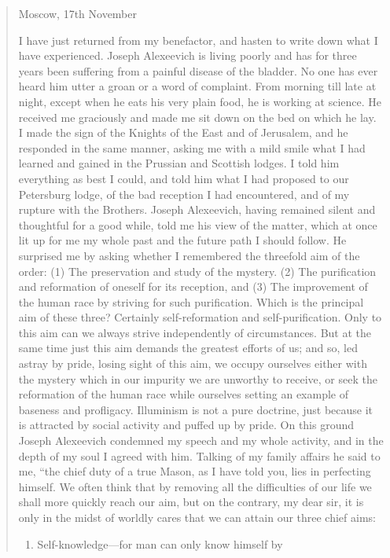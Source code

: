\begin{quote} \calli
Moscow, 17th November

I have just returned from my benefactor, and hasten to write down
what I have experienced. Joseph Alexeevich is living poorly and
has for three years been suffering from a painful disease of the
bladder. No one has ever heard him utter a groan or a word of
complaint. From morning till late at night, except when he eats
his very plain food, he is working at science. He received me
graciously and made me sit down on the bed on which he lay. I
made the sign of the Knights of the East and of Jerusalem, and he
responded in the same manner, asking me with a mild smile what I
had learned and gained in the Prussian and Scottish lodges.  I
told him everything as best I could, and told him what I had
proposed to our Petersburg lodge, of the bad reception I had
encountered, and of my rupture with the Brothers. Joseph
Alexeevich, having remained silent and thoughtful for a good
while, told me his view of the matter, which at once lit up for
me my whole past and the future path I should follow.  He
surprised me by asking whether I remembered the threefold aim of
the order: (1) The preservation and study of the mystery. (2) The
purification and reformation of oneself for its reception, and
(3) The improvement of the human race by striving for such
purification. Which is the principal aim of these three?
Certainly self-reformation and self-purification. Only to this
aim can we always strive independently of circumstances. But at
the same time just this aim demands the greatest efforts of us;
and so, led astray by pride, losing sight of this aim, we occupy
ourselves either with the mystery which in our impurity we are
unworthy to receive, or seek the reformation of the human race
while ourselves setting an example of baseness and
profligacy. Illuminism is not a pure doctrine, just because it is
attracted by social activity and puffed up by pride. On this
ground Joseph Alexeevich condemned my speech and my whole
activity, and in the depth of my soul I agreed with him. Talking
of my family affairs he said to me, ``the chief duty of a true
Mason, as I have told you, lies in perfecting himself. We often
think that by removing all the difficulties of our life we shall
more quickly reach our aim, but on the contrary, my dear sir, it
is only in the midst of worldly cares that we can attain our
three chief aims:
\begin{enumerate}
\item Self-knowledge---for man can only know himself by

\end{enumerate}
\end{quote}
